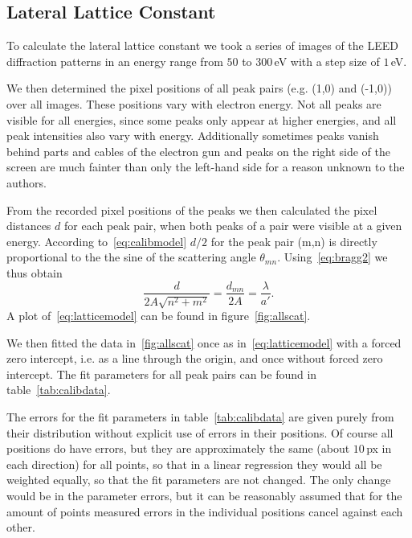 \documentclass[a4paper,10pt]{scrartcl}
\begin{document}
\subsection{Lateral Lattice Constant}

To calculate the lateral lattice constant we took a series of images of the LEED diffraction patterns in an energy range from $50$ to $300\,$eV with a step size of $1\,$eV. 

We then determined the pixel positions of all peak pairs (e.g. (1,0) and (-1,0)) over all images. These positions vary with electron energy. Not all peaks are visible for all energies, since some peaks only appear at higher energies, and all peak intensities also vary with energy. Additionally sometimes peaks vanish behind parts and cables of the electron gun and peaks on the right side of the screen are much fainter than only the left-hand side for a reason unknown to the authors.

From the recorded pixel positions of the peaks we then calculated the pixel distances $d$ for each peak pair, when both peaks of a pair were visible at a given energy. According to~\eqref{eq:calibmodel} $d/2$ for the peak pair (m,n) is directly proportional to the the sine of the scattering angle $\theta_{mn}$. Using~\eqref{eq:bragg2} we thus obtain
\begin{equation}
\frac{d}{2 A \sqrt{n^2 + m^2}} = \frac{d_{mn}}{2A} = \frac{\lambda}{a'}. \label{eq:latticemodel}
\end{equation}
A plot of~\eqref{eq:latticemodel} can be found in figure~\ref{fig:allscat}.

We then fitted the data in~\ref{fig:allscat} once as in~\eqref{eq:latticemodel} with a forced zero intercept, i.e. as a line through the origin, and once without forced zero intercept. The fit parameters for all peak pairs can be found in table~\ref{tab:calibdata}.

The errors for the fit parameters in table~\ref{tab:calibdata} are given purely from their distribution without explicit use of errors in their positions. Of course all positions do have errors, but they are approximately the same (about $10\,$px in each direction) for all points, so that in a linear regression they would all be weighted equally, so that the fit parameters are not changed. The only change would be in the parameter errors, but it can be reasonably assumed that for the amount of points measured errors in the individual positions cancel against each other.
\end{document}
